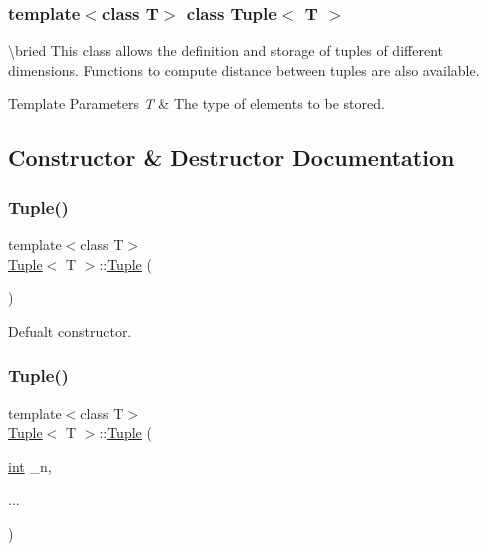 \subsubsection*{template$<$class T$>$\newline
class Tuple$<$ T $>$}

\textbackslash{}bried This class allows the definition and storage of tuples of different dimensions. Functions to compute distance between tuples are also available. 
\begin{DoxyTemplParams}{Template Parameters}
{\em T} & The type of elements to be stored. \\
\hline
\end{DoxyTemplParams}


\subsection{Constructor \& Destructor Documentation}
\mbox{\label{class_tuple_ae8bde0e2215d6d5235a2a45195f7bfae}} 
\subsubsection{\texorpdfstring{Tuple()}{Tuple()}\hspace{0.1cm}{\footnotesize\ttfamily [1/2]}}
{\footnotesize\ttfamily template$<$class T$>$ \\
\mbox{\hyperlink{class_tuple}{Tuple}}$<$ T $>$\+::\mbox{\hyperlink{class_tuple}{Tuple}} (\begin{DoxyParamCaption}{ }\end{DoxyParamCaption})\hspace{0.3cm}{\ttfamily [inline]}}



Defualt constructor. 

\mbox{\label{class_tuple_af64f6017bf08af095addedf084863f22}} 
\subsubsection{\texorpdfstring{Tuple()}{Tuple()}\hspace{0.1cm}{\footnotesize\ttfamily [2/2]}}
{\footnotesize\ttfamily template$<$class T$>$ \\
\mbox{\hyperlink{class_tuple}{Tuple}}$<$ T $>$\+::\mbox{\hyperlink{class_tuple}{Tuple}} (\begin{DoxyParamCaption}\item[{\mbox{\hyperlink{draw_8hh_aa620a13339ac3a1177c86edc549fda9b}{int}}}]{\+\_\+n,  }\item[{}]{... }\end{DoxyParamCaption})\hspace{0.3cm}{\ttfamily [inline]}}



